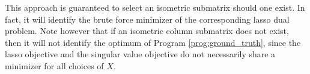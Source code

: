 This approach is guaranteed to select an isometric submatrix should one exist.
In fact, it will identify the brute force minimizer of the corresponding lasso dual problem.
Note however that if an isometric column submatrix does not exist, then it will not identify the optimum of Program \ref{prog:ground_truth}, since the lasso objective and the singular value objective do not necessarily share a minimizer for all choices of $X$.